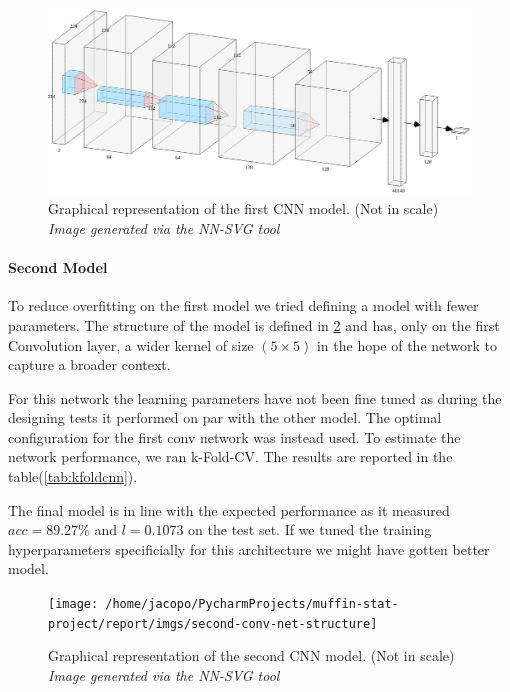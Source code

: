 \begin{figure}[h]
    \centering
    \includegraphics[scale=0.15]{imgs/custom-cnn-one}
    \caption{
        Graphical representation of the first CNN model. (Not in scale)\\
        \textit{Image generated via the NN-SVG tool}
    }\label{fig:custom_cnn}
\end{figure}

\paragraph{Second Model}

To reduce overfitting on the first model we tried defining a model with fewer parameters.
The structure of the model is defined in \ref{fig:second-conv-net-structure}
and has, only on the first Convolution layer, a wider kernel of size $(5\times5)$ in the hope of the network to capture a broader context.

For this network the learning parameters have not been fine tuned as during the designing tests it performed
on par with the other model. The optimal configuration for the first conv network was instead used.
To estimate the network performance, we ran k-Fold-CV. The results are reported in the table(\ref{tab:kfoldcnn}).

The final model is in line with the expected performance as it measured $acc=89.27\%$ and $l=0.1073$
on the test set. If we tuned the training hyperparameters specificially for this architecture we might have gotten better model.


\begin{figure}
    \centering
    \texttt{[image: /home/jacopo/PycharmProjects/muffin-stat-project/report/imgs/second-conv-net-structure]}
    \caption{
        Graphical representation of the second CNN model. (Not in scale)\\
        \textit{Image generated via the NN-SVG tool}
    }
    \label{fig:second-conv-net-structure}
\end{figure}


